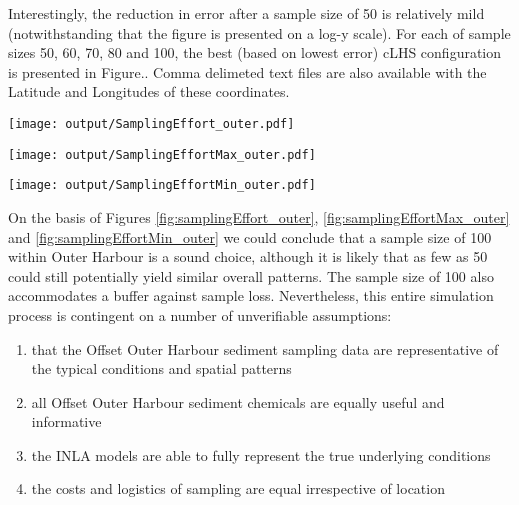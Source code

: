 \documentclass[a4paper]{article}
\let\origfigure=\figure
\let\endorigfigure=\endfigure
\renewenvironment{figure}[1][]{%
   \origfigure[H]
}{%
   \endorigfigure
}
\begin{document}
Interestingly, the reduction in error after a sample size of 50 is
relatively mild (notwithstanding that the figure is presented on a log-y
scale). For each of sample sizes 50, 60, 70, 80 and 100, the best (based
on lowest error) cLHS configuration is presented in Figure.. Comma
delimeted text files are also available with the Latitude and Longitudes
of these coordinates.

\begin{figure}
\centering\scriptsize
\texttt{[image: output/SamplingEffort\_outer.pdf]}
\caption{Comparison of the mean Error conditional on sample size and
sampling method for the Outer Harbour\label{fig:samplingEffort_outer}}
\end{figure}

\begin{figure}
\centering\scriptsize
\texttt{[image: output/SamplingEffortMax\_outer.pdf]}
\caption{Comparison of the maximum Error conditional on sample size and
sampling method for the Outer
Harbour\label{fig:samplingEffortMax_outer}}
\end{figure}

\begin{figure}
\centering\scriptsize
\texttt{[image: output/SamplingEffortMin\_outer.pdf]}
\caption{Comparison of the minimum Error conditional on sample size and
sampling method for the Outer
Harbour\label{fig:samplingEffortMin_outer}}
\end{figure}

On the basis of Figures \ref{fig:samplingEffort_outer},
\ref{fig:samplingEffortMax_outer} and \ref{fig:samplingEffortMin_outer}
we could conclude that a sample size of 100 within Outer Harbour is a
sound choice, although it is likely that as few as 50 could still
potentially yield similar overall patterns. The sample size of 100 also
accommodates a buffer against sample loss. Nevertheless, this entire
simulation process is contingent on a number of unverifiable
assumptions:

\begin{enumerate}
\def\labelenumi{\arabic{enumi}.}
\tightlist
\item
  that the Offset Outer Harbour sediment sampling data are
  representative of the typical conditions and spatial patterns
\item
  all Offset Outer Harbour sediment chemicals are equally useful and
  informative
\item
  the INLA models are able to fully represent the true underlying
  conditions
\item
  the costs and logistics of sampling are equal irrespective of location
\end{enumerate}
\end{document}
